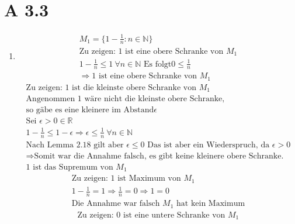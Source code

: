 \documentclass{article}
\begin{document}
    \section*{A 3.3}
        \begin{enumerate}[label = (\alph*)]
            \item 
                \begin{gather*}
                    M_1 = \{1- \frac{1}{n}: n \in \mathbb{N} \} \\
                    \text{Zu zeigen: 1 ist eine obere Schranke von } M_1 \\
                    1 - \frac{1}{n} \leq 1 \: \forall n \in \mathbb{N} \text{ Es folgt} 0 \leq \frac{1}{n} \\
                    \Rightarrow \text{1 ist eine obere Schranke von } M_1
                \end{gather*} 
                \begin{gather*}
                    \text{Zu zeigen: 1 ist die kleinste obere Schranke von } M_1 \\
                    \text{Angenommen 1 wäre nicht die kleinste obere Schranke,} \\
                    \text{so gäbe es eine kleinere im Abstand} \epsilon \\
                    \text{Sei } \epsilon > 0 \in \mathbb{R} \\
                    1 - \frac{1}{n} \leq 1 - \epsilon \Rightarrow \epsilon \leq \frac{1}{n} \: \forall n \in \mathbb{N} \\
                    \text{Nach Lemma 2.18 gilt aber } \epsilon \leq 0 \text{ Das ist aber ein Wiederspruch, da } \epsilon > 0 \\
                    \Rightarrow \text{Somit war die Annahme falsch, es gibt keine kleinere obere Schranke.} \\
                    \text{1 ist das Supremum von } M_1
                \end{gather*}
                \begin{gather*}
                    \text{Zu zeigen: 1 ist Maximum von } M_1 \\
                    1-\frac{1}{n} = 1 \Rightarrow \frac{1}{n} = 0 \Rightarrow 1 = 0 \\
                    \text{Die Annahme war falsch } M_1 \text{ hat kein Maximum}
                \end{gather*}
                \begin{gather*}
                    \text{Zu zeigen: 0 ist eine untere Schranke von } M_1 \\

\end{gather*}
\end{enumerate}
\end{document}
